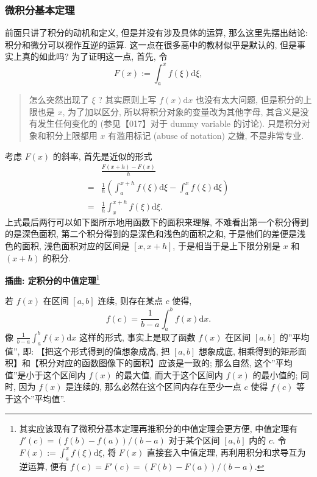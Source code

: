 \hypertarget{ux5faeux79efux5206ux57faux672cux5b9aux7406}{%
\subsubsection{微积分基本定理}\label{ux5faeux79efux5206ux57faux672cux5b9aux7406}}

前面只讲了积分的动机和定义, 但是并没有涉及具体的运算,
那么这里先摆出结论: 积分和微分可以视作互逆的运算.
这一点在很多高中的教材似乎是默认的, 但是事实上真的如此吗?
为了证明这一点, 首先, 令 \[
F(x):=\int_a^xf(\xi)\mathrm{d}\xi,
\]

\begin{quote}
怎么突然出现了 \(\xi\) ? 其实原则上写 \(f(x)\mathrm{d}x\)
也没有太大问题, 但是积分的上限也是 \(x\), 为了加以区分,
所以将积分对象的变量改为其他字母, 其含义是没有发生任何变化的
(参见【017】对于 dummy variable 的讨论). 只是积分对象和积分上限都用
\(x\) 有滥用标记 (abuse of notation) 之嫌, 不是非常专业.
\end{quote}

考虑 \(F(x)\) 的斜率, 首先是近似的形式 \[
\begin{aligned}
&\frac{F(x+h)-F(x)}{h}\\
=&\frac{1}{h}\left(\int_a^{x+h}f(\xi)\mathrm{d}\xi-\int_a^xf(\xi)\mathrm{d}\xi\right)\\
=&\frac{1}{h}\int_x^{x+h}f(\xi)\mathrm{d}\xi.
\end{aligned}
\] 上式最后两行可以如下图所示地用函数下的面积来理解,
不难看出第一个积分得到的是深色面积,
第二个积分得到的是深色和浅色的面积之和, 于是他们的差便是浅色的面积,
浅色面积对应的区间是 \([x,x+h]\), 于是相当于是上下限分别是 \(x\) 和
\((x+h)\) 的积分.

\textbf{插曲: 定积分的中值定理}\footnote{其实应该现有了微积分基本定理再推积分的中值定理会更方便,
  中值定理有 \(f'(c)=(f(b)-f(a))/(b-a)\) 对于某个区间 \([a,b]\) 内的
  \(c\). 令 \(F(x):=\int_a^xf(\xi)\mathrm{d}\xi\), 将 \(F(x)\)
  直接套入中值定理, 再利用积分和求导互为逆运算, 便有
  \(f(c)=F'(c)=(F(b)-F(a))/(b-a)\).}

若 \(f(x)\) 在区间 \([a,b]\) 连续, 则存在某点 \(c\) 使得, \[
\boxed{f(c)=\frac{1}{b-a}\int^b_af(x)\mathrm{d}x.}
\] 像 \(\frac{1}{b-a}\int_a^bf(x)\mathrm{d}x\) 这样的形式,
事实上是取了函数 \(f(x)\) 在区间 \([a,b]\) 的''平均值'', 即:
【把这个形式得到的值想象成高, 把 \([a,b]\) 想象成底,
相乘得到的矩形面积】和【积分对应的函数图像下的面积】应该是一致的;
那么自然, 这个''平均值''是小于这个区间内 \(f(x)\) 的最大值,
而大于这个区间内 \(f(x)\) 的最小值的; 同时, 因为 \(f(x)\) 是连续的,
那么必然在这个区间内存在至少一点 \(c\) 使得 \(f(c)\) 等于这个''平均值''.

